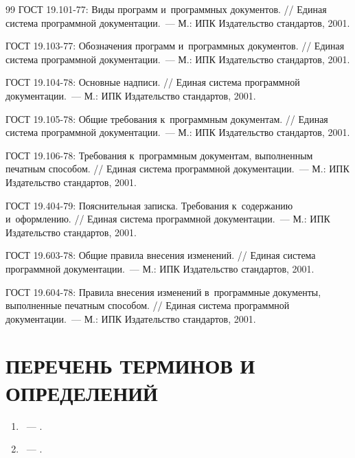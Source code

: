 \documentclass[12pt,a4paper]{extarticle}
\begin{document}
\renewcommand{\refname}{}
\begin{thebibliography}{99}
ГОСТ 19.101-77: Виды программ и~программных документов. // Единая система программной документации.~--- М.: ИПК Издательство стандартов, 2001.

ГОСТ 19.103-77: Обозначения программ и~программных документов. // Единая система программной документации.~--- М.: ИПК Издательство стандартов, 2001.

ГОСТ 19.104-78: Основные надписи. // Единая система программной документации.~--- М.: ИПК Издательство стандартов, 2001.

ГОСТ 19.105-78: Общие требования к~программным документам. // Единая система программной документации.~--- М.: ИПК Издательство стандартов, 2001.

ГОСТ 19.106-78: Требования к~программным документам, выполненным печатным способом. // Единая система программной документации.~--- М.: ИПК Издательство стандартов, 2001.

ГОСТ 19.404-79: Пояснительная записка. Требования к~содержанию и~оформлению. // Единая система программной документации.~--- М.: ИПК Издательство стандартов, 2001.

ГОСТ 19.603-78: Общие правила внесения изменений. // Единая система программной документации.~--- М.: ИПК Издательство стандартов, 2001.

ГОСТ 19.604-78: Правила внесения изменений в~программные документы, выполненные печатным способом. // Единая система программной документации.~--- М.: ИПК Издательство стандартов, 2001.
\end{thebibliography}

\clearpage

\section*{ПЕРЕЧЕНЬ ТЕРМИНОВ И ОПРЕДЕЛЕНИЙ}

\begin{enumerate}[label=\arabic*., leftmargin=1.25cm]
\item \textbf{}~--- .
\item \textbf{}~--- .
\end{enumerate}

\clearpage



\end{document}
